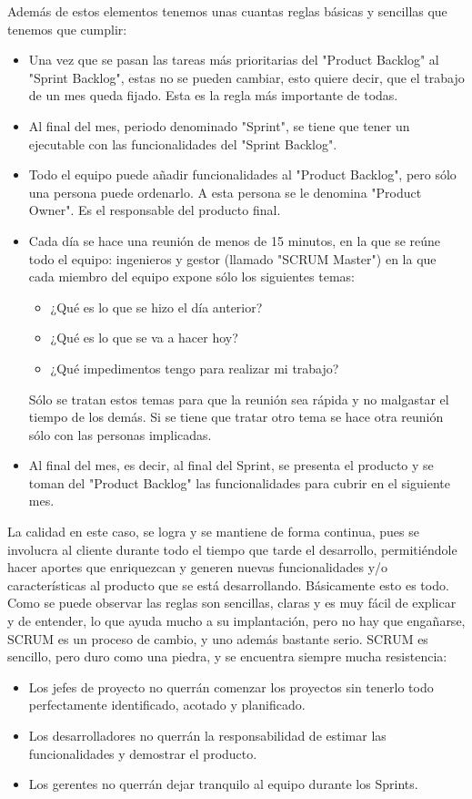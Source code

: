 Además de estos elementos tenemos unas cuantas reglas básicas y sencillas que
tenemos que cumplir:
\begin{itemize}
 \item Una vez que se pasan las tareas más prioritarias del "Product Backlog" al
        "Sprint Backlog", estas no se pueden cambiar, esto quiere decir, que el trabajo
        de un mes queda fijado. Esta es la regla más importante de todas.
 \item Al final del mes, periodo denominado "Sprint", se tiene que tener un ejecutable
        con las funcionalidades del "Sprint Backlog".
 \item Todo el equipo puede añadir funcionalidades al "Product Backlog", pero sólo
        una persona puede ordenarlo. A esta persona se le denomina "Product
        Owner". Es el responsable del producto final.
 \item Cada día se hace una reunión de menos de 15 minutos, en la que se reúne
        todo el equipo: ingenieros y gestor (llamado "SCRUM Master") en la que cada
        miembro del equipo expone sólo los siguientes temas:
	\begin{itemize}
	 \item ¿Qué es lo que se hizo el día anterior?
	 \item ¿Qué es lo que se va a hacer hoy?
	 \item ¿Qué impedimentos tengo para realizar mi trabajo?
	\end{itemize}

        Sólo se tratan estos temas para que la reunión sea rápida y no malgastar el tiempo de los demás. Si se tiene que tratar otro tema se hace otra reunión sólo con las personas implicadas. 
 \item Al final del mes, es decir, al final del Sprint, se presenta el producto y se toman del "Product Backlog" las funcionalidades para cubrir en el siguiente mes.
\end{itemize}

La calidad en este caso, se logra y se mantiene de forma continua, pues se involucra
al cliente durante todo el tiempo que tarde el desarrollo, permitiéndole hacer aportes
que enriquezcan y generen nuevas funcionalidades y/o características al producto que
se está desarrollando.
Básicamente esto es todo.
Como se puede observar las reglas son sencillas, claras y es muy fácil de explicar y de
entender, lo que ayuda mucho a su implantación, pero no hay que engañarse, SCRUM
es un proceso de cambio, y uno además bastante serio.
SCRUM es sencillo, pero duro como una piedra, y se encuentra siempre mucha
resistencia:
\begin{itemize}
 \item Los jefes de proyecto no querrán comenzar los proyectos sin tenerlo todo
        perfectamente identificado, acotado y planificado.
 \item Los desarrolladores no querrán la responsabilidad    de  estimar   las
        funcionalidades y demostrar el producto.
 \item Los gerentes no querrán dejar tranquilo al equipo durante los Sprints.
\end{itemize}

